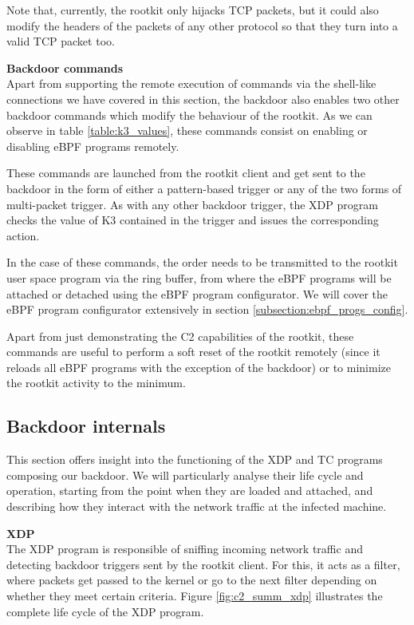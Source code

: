 Note that, currently, the rootkit only hijacks TCP packets, but it could also modify the headers of the packets of any other protocol so that they turn into a valid TCP packet too.


\textbf{Backdoor commands}\\
Apart from supporting the remote execution of commands via the shell-like connections we have covered in this section, the backdoor also enables two other backdoor commands which modify the behaviour of the rootkit. As we can observe in table \ref{table:k3_values}, these commands consist on enabling or disabling eBPF programs remotely.

These commands are launched from the rootkit client and get sent to the backdoor in the form of either a pattern-based trigger or any of the two forms of multi-packet trigger. As with any other backdoor trigger, the XDP program checks the value of K3 contained in the trigger and issues the corresponding action.

In the case of these commands, the order needs to be transmitted to the rootkit user space program via the ring buffer, from where the eBPF programs will be attached or detached using the eBPF program configurator. We will cover the eBPF program configurator extensively in section \ref{subsection:ebpf_progs_config}.

Apart from just demonstrating the C2 capabilities of the rootkit, these commands are useful to perform a soft reset of the rootkit remotely (since it reloads all eBPF programs with the exception of the backdoor) or to minimize the rootkit activity to the minimum.


\subsection{Backdoor internals}
This section offers insight into the functioning of the XDP and TC programs composing our backdoor. We will particularly analyse their life cycle and operation, starting from the point when they are loaded and attached, and describing how they interact with the network traffic at the infected machine.

\textbf{XDP}\\
The XDP program is responsible of sniffing incoming network traffic and detecting backdoor triggers sent by the rootkit client. For this, it acts as a filter, where packets get passed to the kernel or go to the next filter depending on whether they meet certain criteria. Figure \ref{fig:c2_summ_xdp} illustrates the complete life cycle of the XDP program.

